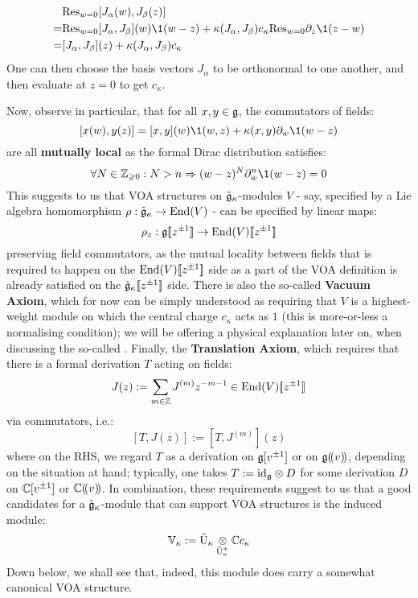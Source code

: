             $$
                \begin{aligned}
                    & \Res_{w = 0} [J_{\alpha}(w), J_{\beta}(z)]
                    \\
                    = & \Res_{w = 0} [J_{\alpha}, J_{\beta}](w) \1(w - z) + \kappa(J_{\alpha}, J_{\beta}) c_{\kappa} \Res_{w = 0} \del_z \1(z - w)
                    \\
                    = & [J_{\alpha}, J_{\beta}](z) + \kappa(J_{\alpha}, J_{\beta}) c_{\kappa} 
                \end{aligned}
            $$
        One can then choose the basis vectors $J_{\alpha}$ to be orthonormal to one another, and then evaluate at $z = 0$ to get $c_{\kappa}$. 

        Now, observe in particular, that for all $x, y \in \mathfrak{g}$, the commutators of fields:
            $$[x(w), y(z)] = [x, y](w) \1(w, z) + \kappa(x, y) \del_w \1(w - z)$$
        are all \textbf{mutually local} as the formal Dirac distribution satisfies:
            $$\forall N \in \Z_{\geq 0}: N > n \implies (w - z)^N \del_w^n \1(w - z) = 0$$
        This suggests to us that VOA structures on $\tilde{\mathfrak{g}}_{\kappa}$-modules $V$ - say, specified by a Lie algebra homomorphism $\rho: \tilde{\mathfrak{g}}_{\kappa} \to \mathrm{End}(V)$ - can be specified by linear maps:
            $$\rho_z: \mathfrak{g}[\![z^{\pm 1}]\!] \to \mathrm{End}(V)[\![z^{\pm 1}]\!]$$
        preserving field commutators, as the mutual locality between fields that is required to happen on the $\mathrm{End}(V)[\![z^{\pm 1}]\!]$ side as a part of the VOA definition is already satisfied on the $\tilde{\mathfrak{g}}_{\kappa}[\![z^{\pm 1}]\!]$ side. There is also the so-called \textbf{Vacuum Axiom}, which for now can be simply understood as requiring that $V$ is a highest-weight module on which the central charge $c_{\kappa}$ acts as $1$ (this is more-or-less a normalising condition); we will be offering a physical explanation later on, when discussing the so-called . Finally, the \textbf{Translation Axiom}, which requires that there is a formal derivation $T$ acting on fields:
            $$J(z) := \sum_{m \in \mathbb{Z}} J^{(m)} z^{-m - 1} \in \mathrm{End}(V)[\![z^{\pm 1}]\!]$$
        via commutators, i.e.:
            $$[T, J(z)] := [T, J^{(m)}](z)$$
        where on the RHS, we regard $T$ as a derivation on $\mathfrak{g}[v^{\pm 1}]$ or on $\mathfrak{g}(\!(v)\!)$, depending on the situation at hand; typically, one takes $T := \id_{\g} \tensor D$ for some derivation $D$ on $\mathbb{C}[v^{\pm 1}]$ or $\mathbb{C}(\!(v)\!)$. In combination, these requirements suggest to us that a good candidates for a $\tilde{\mathfrak{g}}_{\kappa}$-module that can support VOA structures is the induced module:
            $$\V_{\kappa} := \tilde{\rmU}_{\kappa} \tensor_{\tilde{\rmU}_{\kappa}^+} \bbC c_{\kappa}$$
        Down below, we shall see that, indeed, this module does carry a somewhat canonical VOA structure.

